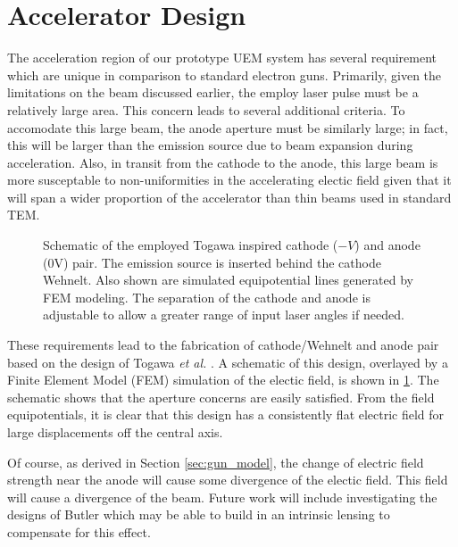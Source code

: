 \section{Accelerator Design} \label{sec:gun_design}

The acceleration region of our prototype UEM system has several requirement which are unique in comparison to standard electron guns.
Primarily, given the limitations on the beam discussed earlier, %
the employ laser pulse must be a relatively large area.
This concern leads to several additional criteria.
To accomodate this large beam, the anode aperture must be similarly large; in fact, this will be larger than the emission source due to beam expansion during acceleration.
Also, in transit from the cathode to the anode, this large beam is more susceptable to non-uniformities in the accelerating electic field given that it will span a wider proportion of the accelerator than thin beams used in standard TEM.

\begin{figure}
  \centering
  
  \caption{
    Schematic of the employed Togawa inspired cathode ($-V$) and anode (0V) pair.
    The emission source is inserted behind the cathode Wehnelt.
    Also shown are simulated equipotential lines generated by FEM modeling.
    The separation of the cathode and anode is adjustable to allow a greater range of input laser angles if needed. 
  }
  \label{fig:gun-field}
\end{figure}

These requirements lead to the fabrication of cathode/Wehnelt and anode pair based on the design of Togawa \textit{et al.} \cite{togawa_ceb6_2007}.
A schematic of this design, overlayed by a Finite Element Model (FEM) simulation of the electic field, is shown in \ref{fig:gun-field}.
The schematic shows that the aperture concerns are easily satisfied.
From the field equipotentials, it is clear that this design has a consistently flat electric field for large displacements off the central axis.

Of course, as derived in Section \ref{sec:gun_model}, the change of electric field strength near the anode will cause some divergence of the electic field.
This field will cause a divergence of the beam.
Future work will include investigating the designs of Butler %
which may be able to build in an intrinsic lensing to compensate for this effect.



